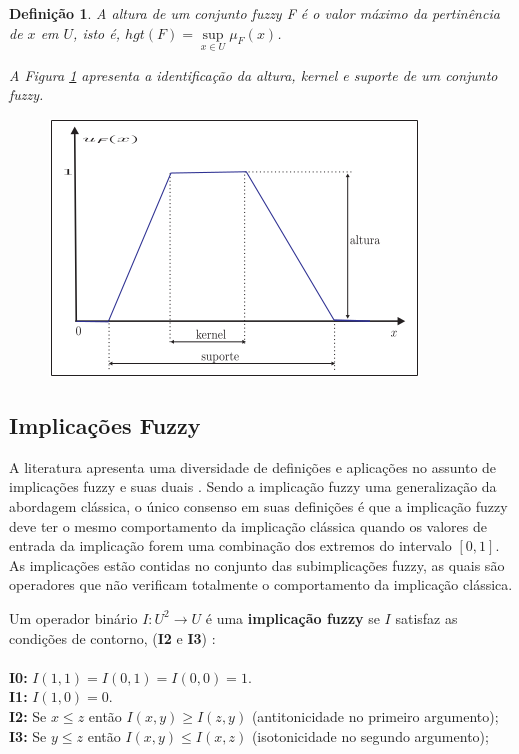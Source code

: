 \documentclass[tcc,capa]{texufpel}
\newtheorem{Def}{Defini\c c\~ao}
\begin{document}
\begin{Def}
A altura de um conjunto fuzzy F é o valor máximo da pertinência de $x$ em $U$, isto é, $hgt(F) = \sup\limits_{x \in U} \mu_{F}(x)$.

A Figura \ref{fig:AltKerSupCF} apresenta a identificação da altura, kernel e suporte de um conjunto fuzzy.

\begin{figure}[ht]
\centering
\includegraphics[scale=0.55]{images/altura_kernel_cf.png}
\label{fig:AltKerSupCF}
\end{figure}

\end{Def}

\subsection{Implicações Fuzzy}

A literatura apresenta uma diversidade de definições e aplicações no assunto de implicações fuzzy e suas duais \cite{baczynski2004residual, baczynski2008introduction, balasubramaniam2007yager}. Sendo a implicação fuzzy uma generalização da abordagem clássica, o único consenso em suas definições é que a implicação fuzzy deve ter o mesmo comportamento da implicação clássica quando os valores de entrada da implicação forem uma combinação dos extremos do intervalo $[0,1]$. As implicações estão contidas no conjunto das subimplicações fuzzy, as quais são operadores que não verificam totalmente o comportamento da implicação clássica.

Um operador binário $I : U^{2} \rightarrow U$ é uma \textbf{implicação fuzzy} se $I$ satisfaz as condições de contorno, (\textbf{I2} e \textbf{I3}) : \\ \\
\textbf{I0:} $I(1,1)=I(0,1)=I(0,0)=1$. \\
\textbf{I1:} $I(1,0)=0$. \\
\textbf{I2:} Se $x \leq z$ então $I(x,y) \geq I(z,y)$ (antitonicidade no primeiro argumento); \\
\textbf{I3:} Se $y \leq z$ então $I(x,y) \leq I(x,z)$ (isotonicidade no segundo argumento); 
\end{document}
